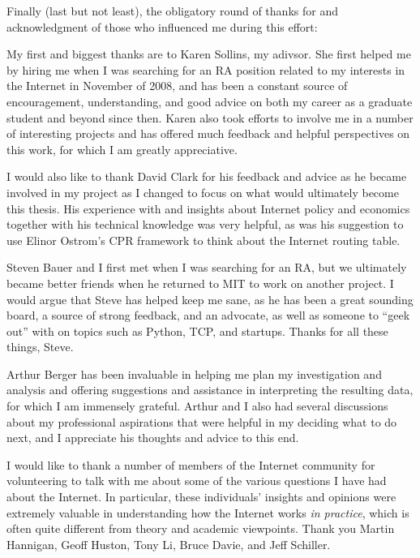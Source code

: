 
\vspace{1em}

Finally (last but not least), the obligatory round of thanks for and
acknowledgment of those who influenced me during this effort:

My first and biggest thanks are to Karen Sollins, my adivsor. She first helped
me by hiring me when I was searching for an RA position related to my interests
in the Internet in November of 2008, and has been a constant source of
encouragement, understanding, and good advice on both my career as a graduate
student and beyond since then. Karen also took efforts to involve me in a
number of interesting projects and has offered much feedback and helpful
perspectives on this work, for which I am greatly appreciative.

I would also like to thank David Clark for his feedback and advice as he became
involved in my project as I changed to focus on what would ultimately become
this thesis. His experience with and insights about Internet policy and
economics together with his technical knowledge was very helpful, as was his
suggestion to use Elinor Ostrom's CPR framework to think about the Internet
routing table.

Steven Bauer and I first met when I was searching for an RA, but we ultimately
became better friends when he returned to MIT to work on another project. I
would argue that Steve has helped keep me sane, as he has been a great sounding
board, a source of strong feedback, and an advocate, as well as someone to
``geek out'' with on topics such as Python, TCP, and startups. Thanks for all
these things, Steve.

Arthur Berger has been invaluable in helping me plan my investigation and
analysis and offering suggestions and assistance in interpreting the resulting
data, for which I am immensely grateful. Arthur and I also had several
discussions about my professional aspirations that were helpful in my deciding
what to do next, and I appreciate his thoughts and advice to this end.

I would like to thank a number of members of the Internet community for
volunteering to talk with me about some of the various questions I have had
about the Internet. In particular, these individuals' insights and opinions
were extremely valuable in understanding how the Internet works \emph{in
practice}, which is often quite different from theory and academic viewpoints.
Thank you Martin Hannigan, Geoff Huston, Tony Li, Bruce Davie, and Jeff
Schiller.

